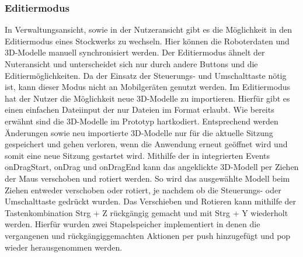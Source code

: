 \subsubsection{Editiermodus}
In Verwaltungsansicht, sowie in der Nutzeransicht gibt es die Möglichkeit in den Editiermodus eines Stockwerks zu wechseln. Hier können die Roboterdaten und 3D-Modelle manuell synchronisiert werden. Der Editiermodus ähnelt der Nuteransicht und unterscheidet sich nur durch andere Buttons und die Editiermöglichkeiten. Da der Einsatz der Steuerungs- und Umschalttaste nötig ist, kann dieser Modus nicht an Mobilgeräten genutzt werden. Im Editiermodus hat der Nutzer die Möglichkeit neue 3D-Modelle zu importieren. Hierfür gibt es einen einfachen Dateiinput der nur Dateien im \glb{} Format erlaubt. Wie bereits erwähnt sind die 3D-Modelle im Prototyp hartkodiert. Entsprechend werden Änderungen sowie neu importierte 3D-Modelle nur für die aktuelle Sitzung gespeichert und gehen verloren, wenn die Anwendung erneut geöffnet wird und somit eine neue Sitzung gestartet wird. Mithilfe der in \deckgl{} integrierten Events onDragStart, onDrag und onDragEnd \cite{DeckglInteractivity} kann das angeklickte 3D-Modell per Ziehen der Maus verschoben und rotiert werden. So wird das ausgewählte Modell beim Ziehen entweder verschoben oder rotiert, je nachdem ob die Steuerungs- oder Umschalttaste gedrückt wurden. Das Verschieben und Rotieren kann mithilfe der Tastenkombination Strg + Z rückgängig gemacht und mit Strg + Y wiederholt werden. Hierfür wurden zwei Stapelspeicher implementiert in denen die vergangenen und rückgängiggemachten Aktionen per push hinzugefügt und pop wieder herausgenommen werden.


